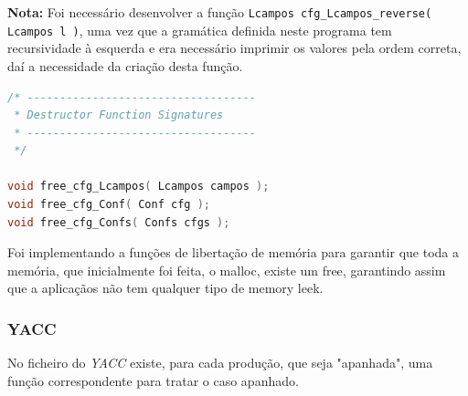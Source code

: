 \documentclass[11pt, a4paper, oneside]{article}
\begin{document}
\textbf{Nota:} Foi necessário desenvolver a função \texttt{Lcampos cfg\_Lcampos\_reverse( Lcampos l )}, uma vez que a gramática definida neste programa tem recursividade à esquerda e era necessário imprimir os valores pela ordem correta, daí a necessidade da criação desta função.

\begin{lstlisting}[language=C, caption={Funções de libertação de memória.}]
/* -----------------------------------
 * Destructor Function Signatures
 * -----------------------------------
 */

void free_cfg_Lcampos( Lcampos campos );
void free_cfg_Conf( Conf cfg );
void free_cfg_Confs( Confs cfgs );
\end{lstlisting} 

Foi implementando a funções de libertação de memória para garantir que toda a memória, que inicialmente foi feita, o malloc, existe um free, garantindo assim que a aplicaçãos não tem qualquer tipo de memory leek.

\newpage
\subsubsection{YACC}
No ficheiro do \textit{YACC} existe, para cada produção, que seja "apanhada", uma função correspondente para tratar o caso apanhado.
\end{document}
